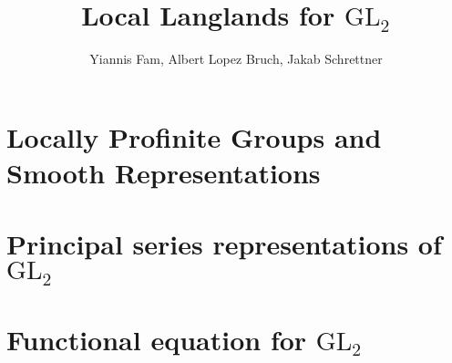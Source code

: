 \documentclass{article}
\title{Local Langlands for $\mathrm{GL}_2$}
\author{Yiannis Fam, Albert Lopez Bruch, Jakab Schrettner}
\newcommand{\GL}{\mathrm{GL}}
\theoremstyle{plain}
\theoremstyle{definition}
\begin{document}
	\maketitle

\section{Locally Profinite Groups and Smooth Representations}




\section{Principal series representations of \texorpdfstring{$\GL_2$}{TEXT}}\label{sec:principal}



\section{Functional equation for \texorpdfstring{$\GL_2$}{TEXT}}









%

%




\newpage



\end{document}
